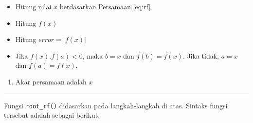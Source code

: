 \documentclass[
]{book}
\providecommand{\tightlist}{%
  \setlength{\itemsep}{0pt}\setlength{\parskip}{0pt}}
\theoremstyle{definition}
\theoremstyle{definition}
\theoremstyle{definition}
\theoremstyle{definition}
\theoremstyle{remark}
\begin{document}
\begin{itemize}
\tightlist
\item
  Hitung nilai \(x\) berdasarkan Persamaan \eqref{eq:rf}
\item
  Hitung \(f\left(x \right)\)
\item
  Hitung \(error=\left|f\left(x \right) \right|\)
\item
  Jika \(f\left(x \right).f\left(a \right)<0\), maka \(b=x\) dan \(f\left(b \right)=f\left(x \right)\). Jika tidak, \(a=x\) dan \(f\left(a \right)=f\left(x \right)\).
\end{itemize}

\begin{enumerate}
\def\labelenumi{\arabic{enumi}.}
\setcounter{enumi}{5}
\tightlist
\item
  Akar persamaan adalah \(x\)
\end{enumerate}

\begin{center}\rule{0.5\linewidth}{0.5pt}\end{center}

Fungsi \texttt{root\_rf()} didasarkan pada langkah-langkah di atas. Sintaks fungsi tersebut adalah sebagai berikut:
\end{document}
